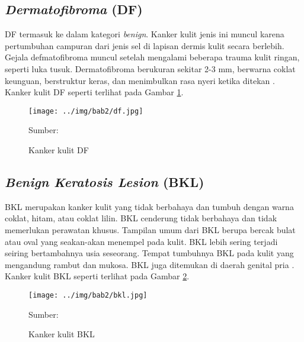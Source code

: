     \subsection{\textit{Dermatofibroma} (DF)}
    DF termasuk ke dalam kategori \textit{benign}. Kanker kulit jenis ini muncul karena pertumbuhan campuran dari jenis sel di lapisan dermis kulit secara berlebih. Gejala defmatofibroma muncul setelah mengalami beberapa trauma kulit ringan, seperti luka tusuk. Dermatofibroma berukuran sekitar 2-3 mm, berwarna coklat keunguan, berstruktur keras, dan menimbulkan rasa nyeri ketika ditekan \citep{Fuadah2020a}. Kanker kulit DF seperti terlihat pada Gambar \ref{fig:df}.
    \begin{figure}[H] 
        \begin{center} 
            \texttt{[image: ../img/bab2/df.jpg]}
            \caption{Kanker kulit DF} 
            \label{fig:df}
            Sumber: \citep{Codella2018,Combalia2019,Tschandl2018}
        \end{center} 
    \end{figure}

    \subsection{\textit{Benign Keratosis Lesion} (BKL)}
    BKL merupakan kanker kulit yang tidak berbahaya dan tumbuh dengan warna coklat, hitam, atau coklat lilin. BKL cenderung tidak berbahaya dan tidak memerlukan perawatan khusus. Tampilan umum dari BKL berupa bercak bulat atau oval yang seakan-akan menempel pada kulit. BKL lebih sering terjadi seiring bertambahnya usia seseorang. Tempat tumbuhnya BKL pada kulit yang mengandung rambut dan mukosa. BKL juga ditemukan di daerah genital pria \citep{Hall2019}. Kanker kulit BKL seperti terlihat pada Gambar \ref{fig:bkl}.
    \begin{figure}[H] 
        \begin{center} 
            \texttt{[image: ../img/bab2/bkl.jpg]}
            \caption{Kanker kulit BKL} 
            \label{fig:bkl}
            Sumber: \citep{Codella2018,Combalia2019,Tschandl2018}
        \end{center} 
    \end{figure}

